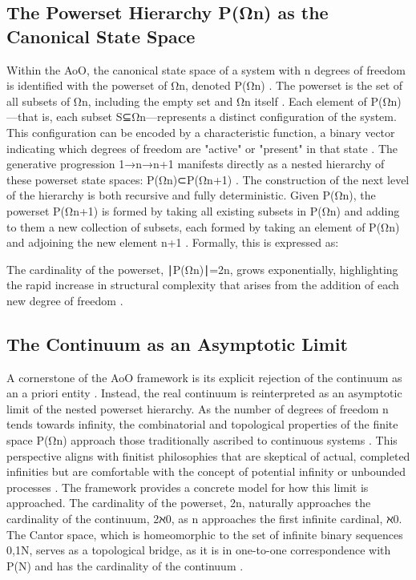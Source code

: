 \documentclass[12pt,a4paper]{article}
\theoremstyle{definition}
\theoremstyle{remark}
\begin{document}
\subsection{The Powerset Hierarchy P(Ωn​) as the Canonical State Space}
Within the AoO, the canonical state space of a system with n degrees of freedom is identified with the powerset of Ωn​, denoted P(Ωn​) \cite{ElKhettabi2025AoO}. The powerset is the set of all subsets of Ωn​, including the empty set and Ωn​ itself \cite{WikipediaPowerset}. Each element of P(Ωn​)—that is, each subset S⊆Ωn​—represents a distinct configuration of the system. This configuration can be encoded by a characteristic function, a binary vector indicating which degrees of freedom are "active" or "present" in that state \cite{ElKhettabi2025AoO, WikipediaPowerset}.
The generative progression 1→n→n+1 manifests directly as a nested hierarchy of these powerset state spaces: P(Ωn​)⊂P(Ωn+1​) \cite{ElKhettabi2024HCN}. The construction of the next level of the hierarchy is both recursive and fully deterministic. Given P(Ωn​), the powerset P(Ωn+1​) is formed by taking all existing subsets in P(Ωn​) and adding to them a new collection of subsets, each formed by taking an element of P(Ωn​) and adjoining the new element {n+1} \cite{WikipediaPowerset}. Formally, this is expressed as:

The cardinality of the powerset, ∣P(Ωn​)∣=2n, grows exponentially, highlighting the rapid increase in structural complexity that arises from the addition of each new degree of freedom \cite{ElKhettabi2024HCN}.
\subsection{The Continuum as an Asymptotic Limit}
A cornerstone of the AoO framework is its explicit rejection of the continuum as an a priori entity \cite{ElKhettabi2025AoO}. Instead, the real continuum is reinterpreted as an asymptotic limit of the nested powerset hierarchy. As the number of degrees of freedom n tends towards infinity, the combinatorial and topological properties of the finite space P(Ωn​) approach those traditionally ascribed to continuous systems \cite{ElKhettabi2025AoO}.
This perspective aligns with finitist philosophies that are skeptical of actual, completed infinities but are comfortable with the concept of potential infinity or unbounded processes \cite{WikipediaFarey, SEP_Finitism}. The framework provides a concrete model for how this limit is approached. The cardinality of the powerset, 2n, naturally approaches the cardinality of the continuum, 2ℵ0​, as n approaches the first infinite cardinal, ℵ0​. The Cantor space, which is homeomorphic to the set of infinite binary sequences {0,1}N, serves as a topological bridge, as it is in one-to-one correspondence with P(N) and has the cardinality of the continuum \cite{WikipediaPowerset}.
\end{document}
